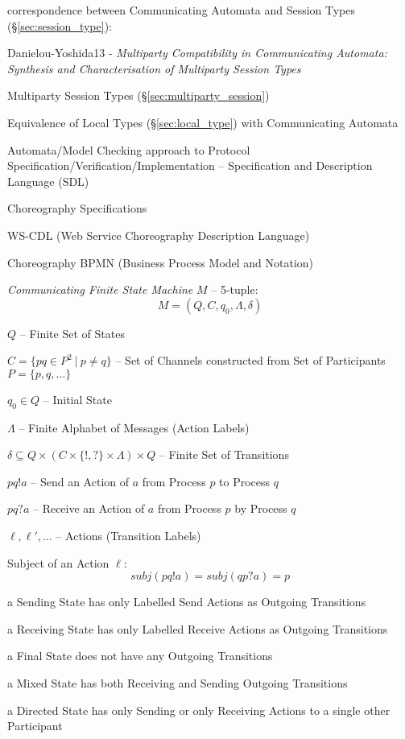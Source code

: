 correspondence between Communicating Automata and Session Types
(\S\ref{sec:session_type}):

Danielou-Yoshida13 - \emph{Multiparty Compatibility in
  Communicating Automata: Synthesis and Characterisation of Multiparty
  Session Types}

Multiparty Session Types (\S\ref{sec:multiparty_session})

Equivalence of Local Types (\S\ref{sec:local_type}) with Communicating
Automata

Automata/Model Checking approach to Protocol
Specification/Verification/Implementation -- Specification and
Description Language (SDL)

Choreography Specifications

WS-CDL (Web Service Choreography Description Language)

Choreography BPMN (Business Process Model and Notation)

\emph{Communicating Finite State Machine} $M$ -- 5-tuple:
\[
  M = (Q,C,q_0,\Lambda,\delta)
\]

$Q$ -- Finite Set of States

$C = \{pq \in P^2 \ |\ p \neq q\}$ -- Set of Channels constructed from
Set of Participants $P = \{ p, q, \ldots \}$

$q_0 \in Q$ -- Initial State

$\Lambda$ -- Finite Alphabet of Messages (Action Labels)

$\delta \subseteq Q \times (C \times \{!,?\} \times \Lambda) \times Q$
-- Finite Set of Transitions

$pq!a$ -- Send an Action of $a$ from Process $p$ to Process $q$

$pq?a$ -- Receive an Action of $a$ from Process $p$ by Process $q$

$\ell, \ell', \ldots$ -- Actions (Transition Labels)

Subject of an Action $\ell$:
\[
  subj(pq!a) = subj(qp?a) = p
\]

a Sending State has only Labelled Send Actions as Outgoing Transitions

a Receiving State has only Labelled Receive Actions as Outgoing
Transitions

a Final State does not have any Outgoing Transitions

a Mixed State has both Receiving and Sending Outgoing Transitions

a Directed State has only Sending or only Receiving Actions to a
single other Participant

